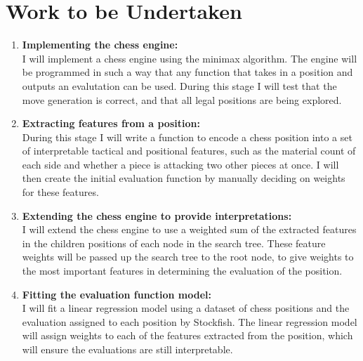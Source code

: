 \documentclass[12pt,a4paper]{article}
\begin{document}
\section*{Work to be Undertaken}
\begin{enumerate}
    \item \textbf{Implementing the chess engine:}
    \\I will implement a chess engine using the minimax algorithm. The engine will be programmed in such a way that any function that takes in a position and outputs an evalutation can be used. During this stage I will test that the move generation is correct, and that all legal positions are being explored.

    \item \textbf{Extracting features from a position:}
    \\During this stage I will write a function to encode a chess position into a set of interpretable tactical and positional features, such as the material count of each side and whether a piece is attacking two other pieces at once. I will then create the initial evaluation function by manually deciding on weights for these features.

    \item \textbf{Extending the chess engine to provide interpretations:}
    \\I will extend the chess engine to use a weighted sum of the extracted features in the children positions of each node in the search tree. These feature weights will be passed up the search tree to the root node, to give weights to the most important features in determining the evaluation of the position.

    \item \textbf{Fitting the evaluation function model:}
    \\I will fit a linear regression model using a dataset of chess positions and the evaluation assigned to each position by Stockfish. The linear regression model will assign weights to each of the features extracted from the position, which will ensure the evaluations are still interpretable.


\end{enumerate}
\end{document}
